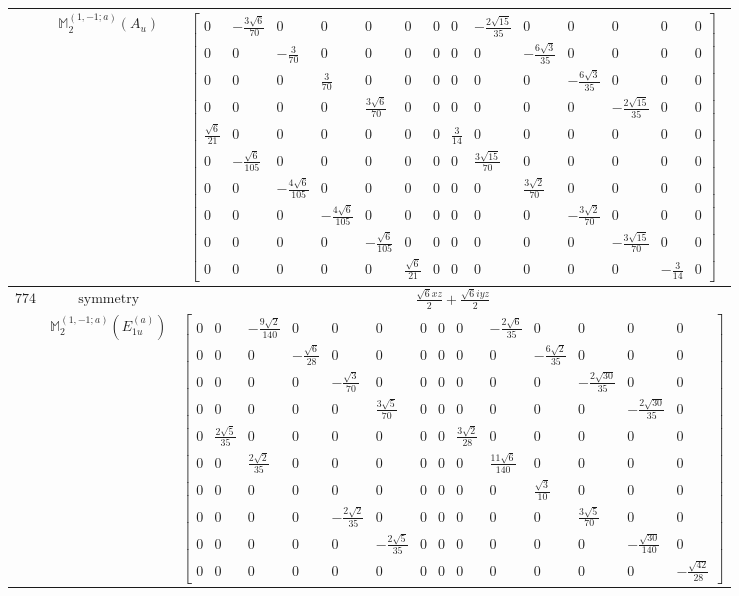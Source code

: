 \documentclass[fleqn,8pt,landscape]{jsarticle}
\begin{document}
\begin{longtable}{ccc}
$  $ & $ \mathbb{M}_{2}^{(1,-1;a)}(A_{u}) $ & $ \begin{bmatrix} 0 & - \frac{3 \sqrt{6}}{70} & 0 & 0 & 0 & 0 & 0 & 0 & - \frac{2 \sqrt{15}}{35} & 0 & 0 & 0 & 0 & 0 \\ 0 & 0 & - \frac{3}{70} & 0 & 0 & 0 & 0 & 0 & 0 & - \frac{6 \sqrt{3}}{35} & 0 & 0 & 0 & 0 \\ 0 & 0 & 0 & \frac{3}{70} & 0 & 0 & 0 & 0 & 0 & 0 & - \frac{6 \sqrt{3}}{35} & 0 & 0 & 0 \\ 0 & 0 & 0 & 0 & \frac{3 \sqrt{6}}{70} & 0 & 0 & 0 & 0 & 0 & 0 & - \frac{2 \sqrt{15}}{35} & 0 & 0 \\ \frac{\sqrt{6}}{21} & 0 & 0 & 0 & 0 & 0 & 0 & \frac{3}{14} & 0 & 0 & 0 & 0 & 0 & 0 \\ 0 & - \frac{\sqrt{6}}{105} & 0 & 0 & 0 & 0 & 0 & 0 & \frac{3 \sqrt{15}}{70} & 0 & 0 & 0 & 0 & 0 \\ 0 & 0 & - \frac{4 \sqrt{6}}{105} & 0 & 0 & 0 & 0 & 0 & 0 & \frac{3 \sqrt{2}}{70} & 0 & 0 & 0 & 0 \\ 0 & 0 & 0 & - \frac{4 \sqrt{6}}{105} & 0 & 0 & 0 & 0 & 0 & 0 & - \frac{3 \sqrt{2}}{70} & 0 & 0 & 0 \\ 0 & 0 & 0 & 0 & - \frac{\sqrt{6}}{105} & 0 & 0 & 0 & 0 & 0 & 0 & - \frac{3 \sqrt{15}}{70} & 0 & 0 \\ 0 & 0 & 0 & 0 & 0 & \frac{\sqrt{6}}{21} & 0 & 0 & 0 & 0 & 0 & 0 & - \frac{3}{14} & 0 \end{bmatrix} $ \\ \hline
$ 774 $ & $ \text{symmetry} $ & $ \frac{\sqrt{6} x z}{2} + \frac{\sqrt{6} i y z}{2} $ \\
$  $ & $ \mathbb{M}_{2}^{(1,-1;a)}(E_{1u}^{(a)}) $ & $ \begin{bmatrix} 0 & 0 & - \frac{9 \sqrt{2}}{140} & 0 & 0 & 0 & 0 & 0 & 0 & - \frac{2 \sqrt{6}}{35} & 0 & 0 & 0 & 0 \\ 0 & 0 & 0 & - \frac{\sqrt{6}}{28} & 0 & 0 & 0 & 0 & 0 & 0 & - \frac{6 \sqrt{2}}{35} & 0 & 0 & 0 \\ 0 & 0 & 0 & 0 & - \frac{\sqrt{3}}{70} & 0 & 0 & 0 & 0 & 0 & 0 & - \frac{2 \sqrt{30}}{35} & 0 & 0 \\ 0 & 0 & 0 & 0 & 0 & \frac{3 \sqrt{5}}{70} & 0 & 0 & 0 & 0 & 0 & 0 & - \frac{2 \sqrt{30}}{35} & 0 \\ 0 & \frac{2 \sqrt{5}}{35} & 0 & 0 & 0 & 0 & 0 & 0 & \frac{3 \sqrt{2}}{28} & 0 & 0 & 0 & 0 & 0 \\ 0 & 0 & \frac{2 \sqrt{2}}{35} & 0 & 0 & 0 & 0 & 0 & 0 & \frac{11 \sqrt{6}}{140} & 0 & 0 & 0 & 0 \\ 0 & 0 & 0 & 0 & 0 & 0 & 0 & 0 & 0 & 0 & \frac{\sqrt{3}}{10} & 0 & 0 & 0 \\ 0 & 0 & 0 & 0 & - \frac{2 \sqrt{2}}{35} & 0 & 0 & 0 & 0 & 0 & 0 & \frac{3 \sqrt{5}}{70} & 0 & 0 \\ 0 & 0 & 0 & 0 & 0 & - \frac{2 \sqrt{5}}{35} & 0 & 0 & 0 & 0 & 0 & 0 & - \frac{\sqrt{30}}{140} & 0 \\ 0 & 0 & 0 & 0 & 0 & 0 & 0 & 0 & 0 & 0 & 0 & 0 & 0 & - \frac{\sqrt{42}}{28} \end{bmatrix} $ \\ \hline

\end{longtable}
\end{document}
